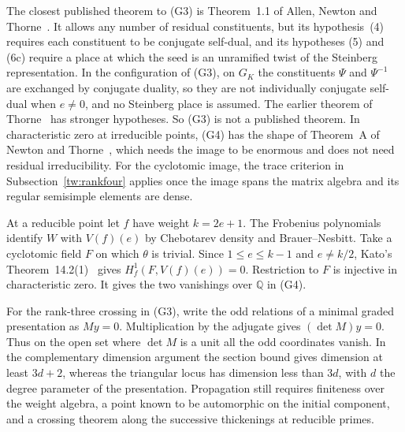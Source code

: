 The closest published theorem to (G3) is Theorem~1.1 of Allen, Newton and Thorne~\cite{ant20}. It allows any number of residual constituents, but its hypothesis~(4) requires each constituent to be conjugate self-dual, and its hypotheses (5) and (6c) require a place at which the seed is an unramified twist of the Steinberg representation. In the configuration of (G3), on $G_K$ the constituents $\Psi$ and $\Psi^{-1}$ are exchanged by conjugate duality, so they are not individually conjugate self-dual when $e\ne0$, and no Steinberg place is assumed. The earlier theorem of Thorne~\cite{thorne15} has stronger hypotheses. So (G3) is not a published theorem. In characteristic zero at irreducible points, (G4) has the shape of Theorem~A of Newton and Thorne~\cite{nt23}, which needs the image to be enormous and does not need residual irreducibility. For the cyclotomic image, the trace criterion in Subsection~\ref{tw:rankfour} applies once the image spans the matrix algebra and its regular semisimple elements are dense.

At a reducible point let $f$ have weight $k=2e+1$. The Frobenius polynomials identify $W$ with $V(f)(e)$ by Chebotarev density and Brauer--Nesbitt. Take a cyclotomic field $F$ on which $\theta$ is trivial. Since $1\le e\le k-1$ and $e\ne k/2$, Kato's Theorem~14.2(1)~\cite{kato04} gives $H^1_f(F,V(f)(e))=0$. Restriction to $F$ is injective in characteristic zero. It gives the two vanishings over $\mathbb Q$ in (G4).

For the rank-three crossing in (G3), write the odd relations of a minimal graded presentation as $My=0$. Multiplication by the adjugate gives $(\det M)y=0$. Thus on the open set where $\det M$ is a unit all the odd coordinates vanish. In the complementary dimension argument the section bound gives dimension at least $3d+2$, whereas the triangular locus has dimension less than $3d$, with $d$ the degree parameter of the presentation. Propagation still requires finiteness over the weight algebra, a point known to be automorphic on the initial component, and a crossing theorem along the successive thickenings at reducible primes.

